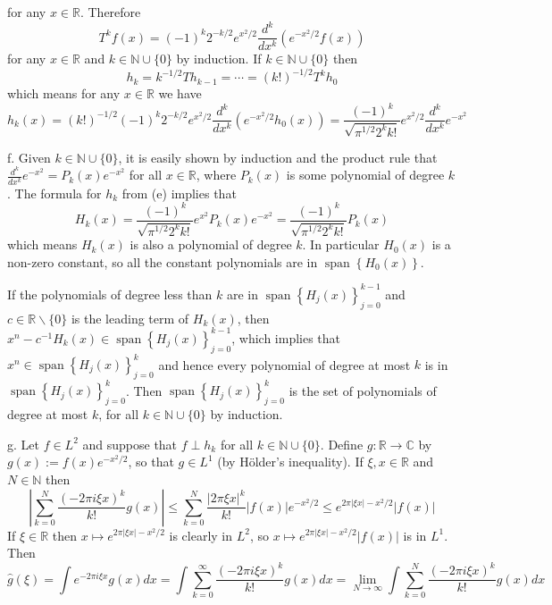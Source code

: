 \documentclass[lang=en,11pt,a4paper,citestyle =authoryear]{elegantpaper}
\begin{document}
for any $x \in \mathbb{R}$. Therefore 
\[T^{k} f(x)=(-1)^{k} 2^{-k / 2} e^{x^{2} / 2} \frac{d^{k}}{d x^{k}}\left(e^{-x^{2} / 2} f(x)\right)\]
for any $x \in \mathbb{R}$ and $k \in \mathbb{N} \cup\{0\}$ by induction. If $k \in \mathbb{N} \cup\{0\}$ then 
\[h_{k}=k^{-1 / 2} T h_{k-1}=\cdots=(k !)^{-1 / 2} T^{k} h_{0}\] which means for any $x \in \mathbb{R}$ we have
\[
h_{k}(x)=(k !)^{-1 / 2}(-1)^{k} 2^{-k / 2} e^{x^{2} / 2} \frac{d^{k}}{d x^{k}}\left(e^{-x^{2} / 2} h_{0}(x)\right)=\frac{(-1)^{k}}{\sqrt{\pi^{1 / 2} 2^{k} k !}} e^{x^{2} / 2} \frac{d^{k}}{d x^{k}} e^{-x^{2}}
\]\par
f. Given $k \in \mathbb{N} \cup\{0\}$, it is easily shown by induction and the product rule that $\frac{d^{k}}{d x^{k}} e^{-x^{2}}=P_{k}(x) e^{-x^{2}}$ for all $x \in \mathbb{R}$, where $P_{k}(x)$ is some polynomial of degree $k$. The formula for $h_{k}$ from (e) implies that
\[
H_{k}(x)=\frac{(-1)^{k}}{\sqrt{\pi^{1 / 2} 2^{k} k !}} e^{x^{2}} P_{k}(x) e^{-x^{2}}=\frac{(-1)^{k}}{\sqrt{\pi^{1 / 2} 2^{k} k !}} P_{k}(x)
\]
which means $H_{k}(x)$ is also a polynomial of degree $k$. In particular $H_{0}(x)$ is a non-zero constant, so all the constant polynomials are in $\operatorname{span}\left\{H_{0}(x)\right\}$.\par
If the polynomials of degree less than $k$ are in $\operatorname{span}\left\{H_{j}(x)\right\}_{j=0}^{k-1}$ and $c \in \mathbb{R} \backslash\{0\}$ is the leading term of $H_{k}(x)$, then $x^{n}-c^{-1} H_{k}(x) \in \operatorname{span}\left\{H_{j}(x)\right\}_{j=0}^{k-1}$, which implies that $x^{n} \in \operatorname{span}\left\{H_{j}(x)\right\}_{j=0}^{k}$ and hence every polynomial of degree at most $k$ is in $\operatorname{span}\left\{H_{j}(x)\right\}_{j=0}^{k}$. Then $\operatorname{span}\left\{H_{j}(x)\right\}_{j=0}^{k}$ is the set of polynomials of degree at most $k$, for all $k \in \mathbb{N} \cup\{0\}$ by induction.\par
g. Let $f \in L^{2}$ and suppose that $f \perp h_{k}$ for all $k \in \mathbb{N} \cup\{0\}$. Define $g: \mathbb{R} \rightarrow \mathbb{C}$ by $g(x):=f(x) e^{-x^{2} / 2}$, so that $g \in L^{1}$ (by Hölder's inequality). If $\xi, x \in \mathbb{R}$ and $N \in \mathbb{N}$ then
\[
\left|\sum_{k=0}^{N} \frac{(-2 \pi i \xi x)^{k}}{k !} g(x)\right| \leq \sum_{k=0}^{N} \frac{|2 \pi \xi x|^{k}}{k !}|f(x)| e^{-x^{2} / 2} \leq e^{2 \pi|\xi x|-x^{2} / 2}|f(x)|
\]
If $\xi \in \mathbb{R}$ then $x \mapsto e^{2 \pi|\xi x|-x^{2} / 2}$ is clearly in $L^{2}$, so $x \mapsto e^{2 \pi|\xi x|-x^{2} / 2}|f(x)|$ is in $L^{1}$. Then
\[
\widehat{g}(\xi)=\int e^{-2 \pi i \xi x} g(x) d x=\int \sum_{k=0}^{\infty} \frac{(-2 \pi i \xi x)^{k}}{k !} g(x) d x=\lim _{N \rightarrow \infty} \int \sum_{k=0}^{N} \frac{(-2 \pi i \xi x)^{k}}{k !} g(x) d x
\]
\end{document}
